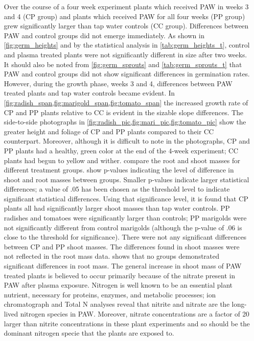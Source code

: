 Over the course of a four week experiment plants which received PAW in weeks 3 and 4 (CP group) and plants which received PAW for all four weeks (PP group) grew significantly larger than tap water controls (CC group).  Differences between PAW and control groups did not emerge immediately.  As shown in \cref{fig:germ_heights} and by the statistical analysis in \cref{tab:germ_heights_t}, control and plasma treated plants were not significantly different in size after two weeks.  It should also be noted from \cref{fig:germ_sprouts} and \cref{tab:germ_sprouts_t} that PAW and control groups did not show significant differences in germination rates.  However, during the growth phase, weeks 3 and 4, differences between PAW treated plants and tap water controls became evident.  In \cref{fig:radish_span,fig:marigold_span,fig:tomato_span} the increased growth rate of CP and PP plants relative to CC is evident in the sizable slope differences.  The side-to-side photographs in \cref{fig:radish_pic,fig:mari_pic,fig:tomato_pic} show the greater height and foliage of CP and PP plants compared to their CC counterpart.  Moreover, although it is difficult to note in the photographs, CP and PP plants had a healthy, green color at the end of the 4-week experiment; CC plants had begun to yellow and wither.   compare the root and shoot masses for different treatment groups.   show p-values indicating the level of difference in shoot and root masses between groups.  Smaller p-values indicate larger statistical differences; a value of .05 has been chosen as the threshold level to indicate significant statistical differences.  Using that significance level, it is found that CP plants all had significantly larger shoot masses than tap water controls.  PP radishes and tomatoes were significantly larger than controls; PP marigolds were not significantly different from control marigolds (although the p-value of .06 is close to the threshold for significance).  There were not any significant differences between CP and PP shoot masses.  The differences found in shoot masses were not reflected in the root mass data.   shows that no groups demonstrated significant differences in root mass.   The general increase in shoot mass of PAW treated plants is believed to occur primarily because of the nitrate present in PAW after plasma exposure.  Nitrogen is well known to be an essential plant nutrient, necessary for proteins, enzymes, and metabolic processes; ion chromatograph and Total N analyses reveal that nitrite and nitrate are the long-lived nitrogen species in PAW.  Moreover, nitrate concentrations are a factor of 20 larger than nitrite concentrations in these plant experiments and so should be the dominant nitrogen specie that the plants are exposed to.

